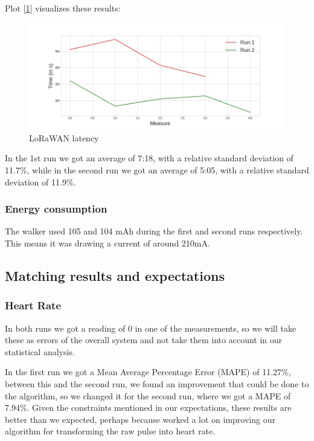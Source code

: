 			Plot [\ref{fig:Latency}] visualizes these results:
			\begin{figure}[h!]
				\centering
				\includegraphics[width=1.1\linewidth]{gfx/latency_diff.jpg}
				\caption{LoRaWAN latency}
				\label{fig:Latency}
			\end{figure}

			In the 1st run we got an average of 7:18, with a relative standard deviation of 11.7\%, while in the second run we got an average of 5:05, with a relative standard deviation of 11.9\%.

		\subsubsection{Energy consumption}
			The walker used 105 and 104 mAh during the first and second runs respectively. This means it was drawing a current of around 210mA.

	\subsection*{Matching results and expectations}
		\subsubsection{Heart Rate}
			In both runs we got a reading of 0 in one of the measurements, so we will take these as errors of the overall system and not take them into account in our statistical analysis.

			In the first run we got a Mean Average Percentage Error (MAPE) of 11.27\%, between this and the second run, we found an improvement that could be done to the algorithm, so we changed it for the second run, where we got a MAPE of 7.94\%. Given the constraints mentioned in our expectations, these results are better than we expected, perhaps because worked a lot on improving our algorithm for transforming the raw pulse into heart rate.

